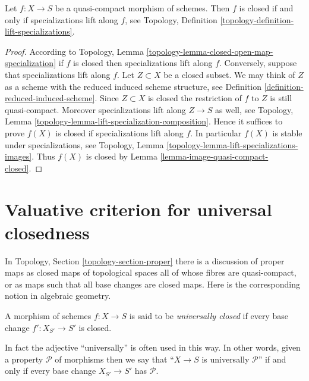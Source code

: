 \begin{lemma}
\label{lemma-quasi-compact-closed}
Let $f : X \to S$ be a quasi-compact morphism of schemes.
Then $f$ is closed if and only if specializations lift
along $f$, see
Topology, Definition \ref{topology-definition-lift-specializations}.
\end{lemma}

\begin{proof}
According to
Topology, Lemma \ref{topology-lemma-closed-open-map-specialization}
if $f$ is closed then specializations lift along $f$.
Conversely, suppose that specializations lift along $f$.
Let $Z \subset X$ be a closed subset. We may think of $Z$
as a scheme with the reduced induced scheme structure, see
Definition \ref{definition-reduced-induced-scheme}.
Since $Z \subset X$ is closed the restriction
of $f$ to $Z$ is still quasi-compact. Moreover specializations lift
along $Z \to S$ as well,
see Topology, Lemma \ref{topology-lemma-lift-specialization-composition}.
Hence it suffices to prove $f(X)$ is closed if specializations lift along $f$.
In particular $f(X)$ is stable under specializations, see
Topology, Lemma \ref{topology-lemma-lift-specializations-images}.
Thus $f(X)$ is closed by
Lemma \ref{lemma-image-quasi-compact-closed}.
\end{proof}










\section{Valuative criterion for universal closedness}
\label{section-valuative-criterion-universal-closedness}

\noindent
In Topology, Section \ref{topology-section-proper} there is a
discussion of proper maps as closed maps of topological spaces
all of whose fibres are quasi-compact, or as maps such that
all base changes are closed maps. Here is the corresponding notion
in algebraic geometry.

\begin{definition}
\label{definition-universally-closed}
A morphism of schemes $f : X \to S$ is said to be
{\it universally closed} if every base change
$f' : X_{S'} \to S'$ is closed.
\end{definition}

\noindent
In fact the adjective ``universally'' is often used in this way.
In other words, given a property $\mathcal{P}$ of morphisms
then we say that ``$X \to S$ is universally $\mathcal{P}$''
if and only if every base change $X_{S'} \to S'$ has $\mathcal{P}$.

